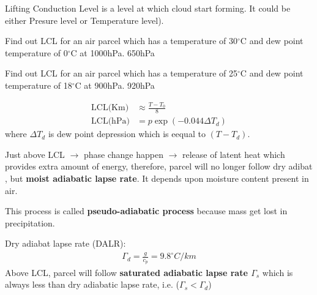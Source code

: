 \documentclass[fleqn,10pt]{SelfArx} %
\begin{document}
Lifting Conduction Level is a level at which cloud start forming. It could be either Presure level or Temperature level).


\begin{question}[\label=21.1]{Find out LCL for an air parcel which has a temperature of 30$^\circ$C and dew point temperature of 0$^\circ$C at 1000hPa.}
    \Rightarrow 650hPa
\end{question}

\begin{question}[\label=21.2]{Find out LCL for an air parcel which has a temperature of 25$^\circ$C and dew point temperature of 18$^\circ$C at 900hPa.}
    \Rightarrow 920hPa
\end{question}

\begin{align}
    \text{LCL(Km)} &\approx \frac{T-T_0}{8} \\
    \text{LCL(hPa)} &= p \exp(-0.044\Delta T_d)
\end{align}
where $\Delta T_d$ is dew point depression which is eequal to $(T-T_d)$.

Just above LCL $\rightarrow$ phase change happen $\rightarrow$ release of latent heat which provides extra amount of energy, therefore, parcel will no longer follow dry adibat , but \textbf{moist adiabatic lapse rate}. It depends upon moisture content present in air.

This process is called \textbf{pseudo-adiabatic process} because mass get lost in precipitation. \newline

Dry adiabat lapse rate (DALR):
\begin{align*}
    \Gamma_d = \frac{g}{c_p}= 9.8^\circ C/km
\end{align*}
Above LCL, parcel will follow \textbf{saturated adiabatic lapse rate $\Gamma_s$} which is always less than dry adiabatic lapse rate, i.e. ($\Gamma_s < \Gamma_d$)
\end{document}
